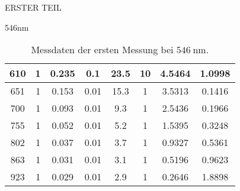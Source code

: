 \begin{appendix}
\begin{chapter}{ERSTER TEIL}
\begin{section}{546nm}
\begin{table}[htbp]
\begin{tabular}{|c|c|c|c|c|c|c|c|}
            610 & 1 & 0.235 & 0.1 & 23.5 & 10 & 4.5464 & 1.0998 \\ \hline
            651 & 1 & 0.153 & 0.01 & 15.3 & 1 & 3.5313 & 0.1416 \\ \hline
            700 & 1 & 0.093 & 0.01 & 9.3 & 1 & 2.5436 & 0.1966 \\ \hline
            755 & 1 & 0.052 & 0.01 & 5.2 & 1 & 1.5395 & 0.3248 \\ \hline
            802 & 1 & 0.037 & 0.01 & 3.7 & 1 & 0.9327 & 0.5361 \\ \hline
            863 & 1 & 0.031 & 0.01 & 3.1 & 1 & 0.5196 & 0.9623 \\ \hline
            923 & 1 & 0.029 & 0.01 & 2.9 & 1 & 0.2646 & 1.8898 \\ \hline
          \end{tabular}
          \caption{Messdaten der ersten Messung bei $\SI{546}{\nano\meter}$.}
          \label{tab:546_1}
        \end{table}
        

\end{section}
\end{chapter}
\end{appendix}
